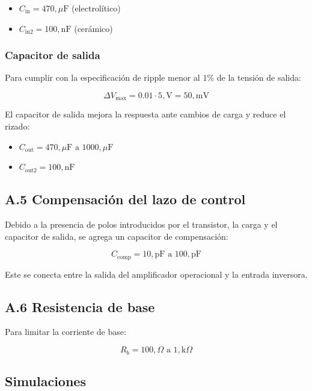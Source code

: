 \documentclass[12pt,a4paper]{article}
\begin{document}
\begin{itemize}
\item $C_{\mathrm{in}} = 470,\mu\mathrm{F}$ (electrolítico)
\item $C_{\mathrm{in2}} = 100,\mathrm{nF}$ (cerámico)
\end{itemize}

\subsubsection*{Capacitor de salida}

Para cumplir con la especificación de ripple menor al $1\%$ de la tensión de salida:

\[
\Delta V_{\mathrm{max}} = 0.01 \cdot 5,\mathrm{V} = 50,\mathrm{mV}
\]

El capacitor de salida mejora la respuesta ante cambios de carga y reduce el rizado:

\begin{itemize}
\item $C_{\mathrm{out}} = 470,\mu\mathrm{F} \text{ a } 1000,\mu\mathrm{F}$
\item $C_{\mathrm{out2}} = 100,\mathrm{nF}$
\end{itemize}

\subsection*{A.5 Compensación del lazo de control}

Debido a la presencia de polos introducidos por el transistor, la carga y el capacitor de salida, se agrega un capacitor de compensación:

\[
C_{\mathrm{comp}} = 10,\mathrm{pF} \text{ a } 100,\mathrm{pF}
\]

Este se conecta entre la salida del amplificador operacional y la entrada inversora.

\subsection*{A.6 Resistencia de base}

Para limitar la corriente de base:

\[
R_b = 100,\Omega \text{ a } 1,\mathrm{k}\Omega
\]

\subsection{Simulaciones}
\end{document}
